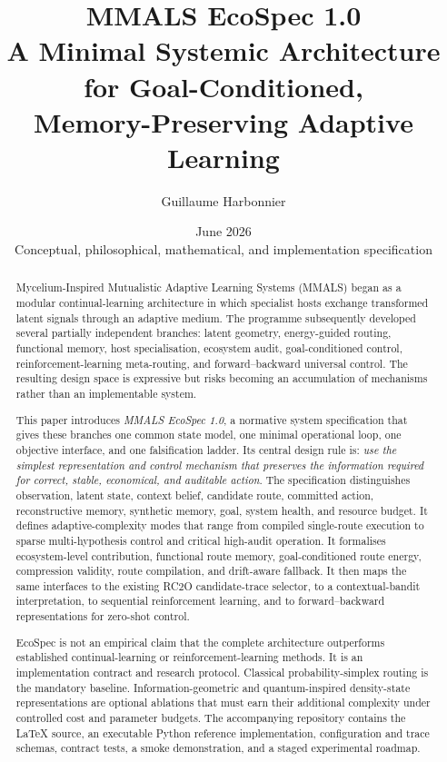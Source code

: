 \documentclass[10pt]{article}
\title{\textbf{MMALS EcoSpec 1.0}\\
\large A Minimal Systemic Architecture for Goal-Conditioned,\\
Memory-Preserving Adaptive Learning}
\author[1]{Guillaume Harbonnier}
\affil[1]{MMALS Project, Independent Research Programme}
\date{June 2026\\\small Conceptual, philosophical, mathematical, and implementation specification}
\begin{document}
\maketitle

\begin{abstract}
Mycelium-Inspired Mutualistic Adaptive Learning Systems (MMALS) began as a modular continual-learning architecture in which specialist hosts exchange transformed latent signals through an adaptive medium. The programme subsequently developed several partially independent branches: latent geometry, energy-guided routing, functional memory, host specialisation, ecosystem audit, goal-conditioned control, reinforcement-learning meta-routing, and forward--backward universal control. The resulting design space is expressive but risks becoming an accumulation of mechanisms rather than an implementable system.

This paper introduces \emph{MMALS EcoSpec 1.0}, a normative system specification that gives these branches one common state model, one minimal operational loop, one objective interface, and one falsification ladder. Its central design rule is: \emph{use the simplest representation and control mechanism that preserves the information required for correct, stable, economical, and auditable action}. The specification distinguishes observation, latent state, context belief, candidate route, committed action, reconstructive memory, synthetic memory, goal, system health, and resource budget. It defines adaptive-complexity modes that range from compiled single-route execution to sparse multi-hypothesis control and critical high-audit operation. It formalises ecosystem-level contribution, functional route memory, goal-conditioned route energy, compression validity, route compilation, and drift-aware fallback. It then maps the same interfaces to the existing RC2O candidate-trace selector, to a contextual-bandit interpretation, to sequential reinforcement learning, and to forward--backward representations for zero-shot control.

EcoSpec is not an empirical claim that the complete architecture outperforms established continual-learning or reinforcement-learning methods. It is an implementation contract and research protocol. Classical probability-simplex routing is the mandatory baseline. Information-geometric and quantum-inspired density-state representations are optional ablations that must earn their additional complexity under controlled cost and parameter budgets. The accompanying repository contains the LaTeX source, an executable Python reference implementation, configuration and trace schemas, contract tests, a smoke demonstration, and a staged experimental roadmap.
\end{abstract}
\end{document}
